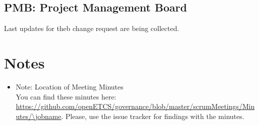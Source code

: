 \documentclass[a4paper, 11pt]{article}
\begin{document}
\subsection{PMB: Project Management Board}

Last updates for theb change request are being collected.

\section{Notes}
\begin{itemize}

\item Note: Location of Meeting Minutes\\
You can find these minutes here: \url{https://github.com/openETCS/governance/blob/master/scrumMeetings/Minutes/\jobname}. Please, use the issue tracker for findings with the minutes.

\end{itemize}
\end{document}
